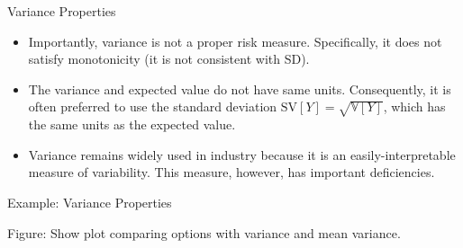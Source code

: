 \documentclass[9pt]{beamer}
\begin{document}
%
\begin{frame}{Variance Properties}

\begin{itemize}

\item Importantly, variance is not a proper risk measure. Specifically, it does not satisfy monotonicity (it is not consistent with SD). 

\item The variance and expected value do not have same units. Consequently, it is often preferred to use the standard deviation $\textrm{SV}[Y]=\sqrt{\mathbb{V}[Y]}$, which has the same units as the expected value. 

\item Variance remains widely used in industry because it is an easily-interpretable measure of variability. This measure, however, has important deficiencies. 

\end{itemize}


\end{frame}

%
\begin{frame}{Example: Variance Properties}

\begin{block}{}
Figure: Show plot comparing  options with variance and mean variance. 
\end{block}

\end{frame}
\end{document}
